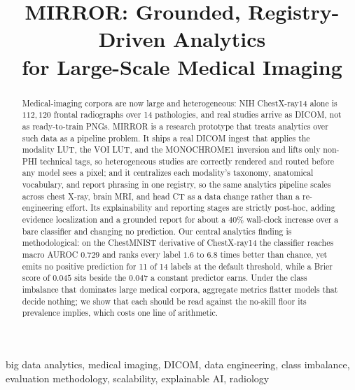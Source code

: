 \documentclass[conference]{IEEEtran}
\begin{document}
\title{MIRROR: Grounded, Registry-Driven Analytics\\
for Large-Scale Medical Imaging}

\author{%
}

\maketitle

\begin{abstract}
Medical-imaging corpora are now large and heterogeneous: NIH ChestX-ray14 alone is
$112{,}120$ frontal radiographs over 14 pathologies, and real studies arrive as
DICOM, not as ready-to-train PNGs. MIRROR is a research prototype that treats
analytics over such data as a pipeline problem. It ships a real DICOM ingest that
applies the modality LUT, the VOI LUT, and the MONOCHROME1 inversion and lifts only
non-PHI technical tags, so heterogeneous studies are correctly rendered and routed
before any model sees a pixel; and it centralizes each modality's taxonomy,
anatomical vocabulary, and report phrasing in one registry, so the same analytics
pipeline scales across chest X-ray, brain MRI, and head CT as a data change rather
than a re-engineering effort. Its explainability and reporting stages are strictly
post-hoc, adding evidence localization and a grounded report for about a $40\%$
wall-clock increase over a bare classifier and changing no prediction. Our central
analytics finding is methodological: on the ChestMNIST derivative of ChestX-ray14
the classifier reaches macro AUROC $0.729$ and ranks every label $1.6$ to $6.8$
times better than chance, yet emits no positive prediction for 11 of 14 labels at
the default threshold, while a Brier score of $0.045$ sits beside the $0.047$ a
constant predictor earns. Under the class imbalance that dominates large medical
corpora, aggregate metrics flatter models that decide nothing; we show that each
should be read against the no-skill floor its prevalence implies, which costs one
line of arithmetic.
\end{abstract}

\begin{IEEEkeywords}
big data analytics, medical imaging, DICOM, data engineering, class imbalance,
evaluation methodology, scalability, explainable AI, radiology
\end{IEEEkeywords}
\end{document}
